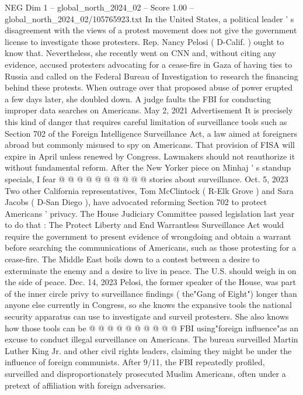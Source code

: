 \begin{textsample}{NEG Dim 1 – global\_north\_2024\_02 – Score 1.00 – global\_north\_2024\_02/105765923.txt}  \label{ex:f1_neg_350}
In the United States, a political leader ' s disagreement with the views of a protest movement does not give the government license to investigate those protesters.
Rep.
Nancy Pelosi ( D-Calif. ) ought to know that.
Nevertheless, she recently went on CNN and, without citing any evidence, accused protesters advocating for a cease-fire in Gaza of having ties to Russia and called on the Federal Bureau of Investigation to research the financing behind these protests.
When outrage over that proposed abuse of power erupted a few days later, she doubled down.
A judge faults the FBI for conducting improper data searches on Americans.
May 2, 2021 Advertisement It is precisely this kind of danger that requires careful limitation of surveillance tools such as Section 702 of the Foreign Intelligence Surveillance Act, a law aimed at foreigners abroad but commonly misused to spy on Americans.
That provision of FISA will expire in April unless renewed by Congress.
Lawmakers should not reauthorize it without fundamental reform.
After the New Yorker piece on Minhaj ' s standup specials, I fear @ @ @ @ @ @ @ @ @ @ stories about surveillance.
Oct. 5, 2023 Two other California representatives, Tom McClintock ( R-Elk Grove ) and Sara Jacobs ( D-San Diego ), have advocated reforming Section 702 to protect Americans ' privacy.
The House Judiciary Committee passed legislation last year to do that : The Protect Liberty and End Warrantless Surveillance Act would require the government to present evidence of wrongdoing and obtain a warrant before searching the communications of Americans, such as those protesting for a cease-fire.
The Middle East boils down to a contest between a desire to exterminate the enemy and a desire to live in peace.
The U.S. should weigh in on the side of peace.
Dec. 14, 2023 Pelosi, the former speaker of the House, was part of the inner circle privy to surveillance findings ( the"Gang of Eight") longer than anyone else currently in Congress, so she knows the expansive tools the national security apparatus can use to investigate and surveil protesters.
She also knows how those tools can be @ @ @ @ @ @ @ @ @ @ FBI using"foreign influence"as an excuse to conduct illegal surveillance on Americans.
The bureau surveilled Martin Luther King Jr. and other civil rights leaders, claiming they might be under the influence of foreign communists.
After 9/11, the FBI repeatedly profiled, surveilled and disproportionately prosecuted Muslim Americans, often under a pretext of affiliation with foreign adversaries.

\end{textsample}
